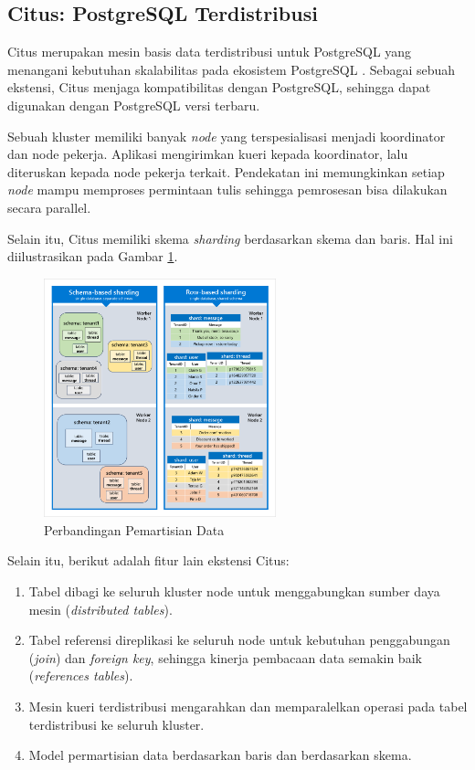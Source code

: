 \subsection{Citus: PostgreSQL Terdistribusi}

Citus merupakan mesin basis data terdistribusi untuk PostgreSQL yang menangani kebutuhan skalabilitas pada ekosistem PostgreSQL \parencite{citus}. Sebagai sebuah ekstensi, Citus menjaga kompatibilitas dengan PostgreSQL, sehingga dapat digunakan dengan PostgreSQL versi terbaru.

Sebuah kluster memiliki banyak \textit{node} yang terspesialisasi menjadi koordinator dan node pekerja. Aplikasi mengirimkan kueri kepada koordinator, lalu diteruskan kepada node pekerja terkait. Pendekatan ini memungkinkan setiap \textit{node} mampu memproses permintaan tulis sehingga pemrosesan bisa dilakukan secara parallel.

Selain itu, Citus memiliki skema \textit{sharding} berdasarkan skema dan baris. Hal ini diilustrasikan pada Gambar \ref{fig:row-vs-schema-sharding}.

\begin{figure}[htbp]
    \centering
    \includegraphics[width=0.6\textwidth]{resources/chapter-2/row-vs-schema-sharding.png}
    \caption{Perbandingan Pemartisian Data \parencite{schemaBasedSharding}}
    \label{fig:row-vs-schema-sharding}
\end{figure}

Selain itu, berikut adalah fitur lain ekstensi Citus:

\begin{enumerate}
    \item Tabel dibagi ke seluruh kluster node untuk menggabungkan sumber daya mesin (\textit{distributed tables}).
    \item Tabel referensi direplikasi ke seluruh node untuk kebutuhan penggabungan (\textit{join}) dan \textit{foreign key}, sehingga kinerja pembacaan data semakin baik (\textit{references tables}).
    \item Mesin kueri terdistribusi mengarahkan dan memparalelkan operasi pada tabel terdistribusi ke seluruh kluster.
    \item Model permartisian data berdasarkan baris dan berdasarkan skema.
\end{enumerate}
